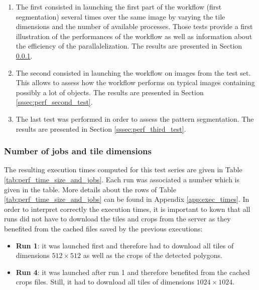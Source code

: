 \begin{enumerate}
	\item The first consisted in launching the first part of the workflow (first segmentation) several times over the same image by varying the tile dimensions and the number of available processes. Those tests provide a first illustration of the performances of the workflow as well as information about the efficiency of the parallalelization. The results are presented in Section \ref{sssec:perf_first_test_serie}.
	\item The second consisted in launching the workflow on images from the test set. This allows to assess how the workflow performs on typical images containing possibly a lot of objects. The results are presented in Section \ref{sssec:perf_second_test}.
	\item The last test was performed in order to assess the pattern segmentation. The results are presented in Section \ref{sssec:perf_third_test}.
\end{enumerate} 

\subsubsection{Number of jobs and tile dimensions}
\label{sssec:perf_first_test_serie}
The resulting execution times computed for this test series are given in Table \ref{tab:perf_time_size_and_jobs}. Each run was associated a number which is given in the table. More details about the rows of Table \ref{tab:perf_time_size_and_jobs} can be found in Appendix \ref{app:exec_times}. In order to interpret correctly the execution times, it is important to kown that all runs did not have to download the tiles and crops from the server as they benefited from the cached files saved by the previous executions: 

\begin{itemize}
	\item \textbf{Run 1}: it was launched first and therefore had to download all tiles of dimensions $512\times 512$ as well as the crops of the detected polygons.
	\item \textbf{Run 4}: it was launched after run 1 and therefore benefited from the cached crops files. Still, it had to download all tiles of dimensions $1024\times 1024$.
\end{itemize}

